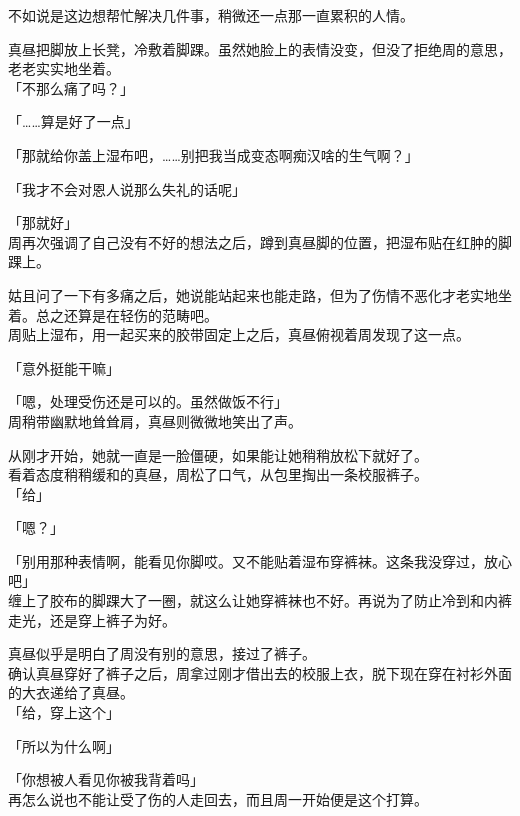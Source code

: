 不如说是这边想帮忙解决几件事，稍微还一点那一直累积的人情。

真昼把脚放上长凳，冷敷着脚踝。虽然她脸上的表情没变，但没了拒绝周的意思，老老实实地坐着。\\

「不那么痛了吗？」

「……算是好了一点」

「那就给你盖上湿布吧，……别把我当成变态啊痴汉啥的生气啊？」

「我才不会对恩人说那么失礼的话呢」

「那就好」\\

周再次强调了自己没有不好的想法之后，蹲到真昼脚的位置，把湿布贴在红肿的脚踝上。

姑且问了一下有多痛之后，她说能站起来也能走路，但为了伤情不恶化才老实地坐着。总之还算是在轻伤的范畴吧。\\

周贴上湿布，用一起买来的胶带固定上之后，真昼俯视着周发现了这一点。

「意外挺能干嘛」

「嗯，处理受伤还是可以的。虽然做饭不行」\\

周稍带幽默地耸耸肩，真昼则微微地笑出了声。

从刚才开始，她就一直是一脸僵硬，如果能让她稍稍放松下就好了。\\

看着态度稍稍缓和的真昼，周松了口气，从包里掏出一条校服裤子。\\

「给」

「嗯？」

「别用那种表情啊，能看见你脚哎。又不能贴着湿布穿裤袜。这条我没穿过，放心吧」\\

缠上了胶布的脚踝大了一圈，就这么让她穿裤袜也不好。再说为了防止冷到和内裤走光，还是穿上裤子为好。

真昼似乎是明白了周没有别的意思，接过了裤子。\\

确认真昼穿好了裤子之后，周拿过刚才借出去的校服上衣，脱下现在穿在衬衫外面的大衣递给了真昼。\\

「给，穿上这个」

「所以为什么啊」

「你想被人看见你被我背着吗」\\

再怎么说也不能让受了伤的人走回去，而且周一开始便是这个打算。

